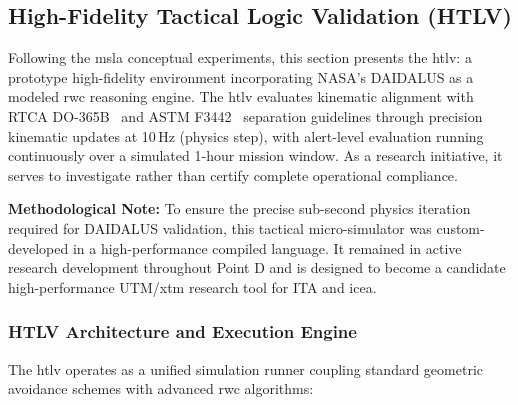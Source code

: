 
\subsection{High-Fidelity Tactical Logic Validation (HTLV)}
\label{sec:htlv_architecture}

Following the \gls{msla} conceptual experiments, this section presents the \gls{htlv}: a
prototype high-fidelity environment incorporating NASA's DAIDALUS as a modeled \gls{rwc}
reasoning engine. The \gls{htlv} evaluates kinematic alignment with RTCA DO-365B~\cite{rtca_do365b}
and ASTM F3442~\cite{astm_f3442} separation guidelines through precision kinematic updates at
10\,Hz (physics step), with alert-level evaluation running continuously over a simulated 1-hour
mission window. As a research initiative, it serves to investigate rather than certify complete
operational compliance.

\textbf{Methodological Note:} To ensure the precise sub-second physics iteration required for
DAIDALUS validation, this tactical micro-simulator was custom-developed in a
high-performance compiled language. It remained in active research development throughout
Point D and is designed to become a candidate high-performance UTM/\gls{xtm} research tool
for ITA and \gls{icea}.

\subsubsection{HTLV Architecture and Execution Engine}

The \gls{htlv} operates as a unified simulation runner coupling standard geometric avoidance
schemes with advanced \gls{rwc} algorithms:

